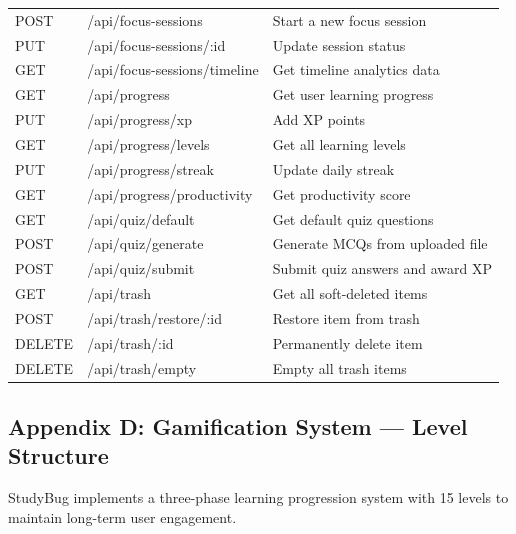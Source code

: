\begin{longtable}{|l|l|p{6cm}|}
POST & /api/focus-sessions & Start a new focus session \\
PUT & /api/focus-sessions/:id & Update session status \\
GET & /api/focus-sessions/timeline & Get timeline analytics data \\
\hline
GET & /api/progress & Get user learning progress \\
PUT & /api/progress/xp & Add XP points \\
GET & /api/progress/levels & Get all learning levels \\
PUT & /api/progress/streak & Update daily streak \\
GET & /api/progress/productivity & Get productivity score \\
\hline
GET & /api/quiz/default & Get default quiz questions \\
POST & /api/quiz/generate & Generate MCQs from uploaded file \\
POST & /api/quiz/submit & Submit quiz answers and award XP \\
\hline
GET & /api/trash & Get all soft-deleted items \\
POST & /api/trash/restore/:id & Restore item from trash \\
DELETE & /api/trash/:id & Permanently delete item \\
DELETE & /api/trash/empty & Empty all trash items \\
\hline
\end{longtable}

\pagebreak

\subsection*{Appendix D: Gamification System — Level Structure}

StudyBug implements a three-phase learning progression system with 15 levels to maintain long-term user engagement.

